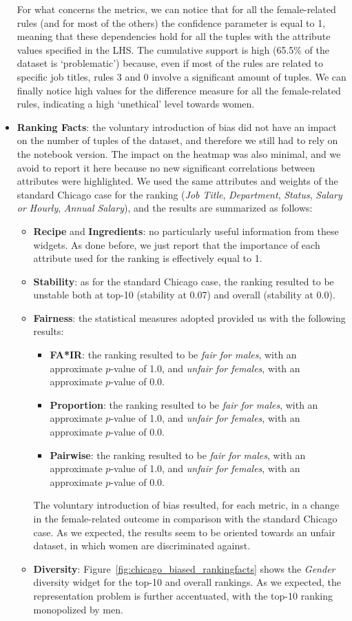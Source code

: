 \begin{itemize}
For what concerns the metrics, we can notice that for all the female-related rules (and for most of the others) the confidence parameter is equal to 1, meaning that these dependencies hold for all the tuples with the attribute values specified in the LHS. The cumulative support is high (65.5\% of the dataset is `problematic') because, even if most of the rules are related to specific job titles, rules 3 and 0 involve a significant amount of tuples. We can finally notice high values for the difference measure for all the female-related rules, indicating a high `unethical' level towards women.
\item \textbf{Ranking Facts}: the voluntary introduction of bias did not have an impact on the number of tuples of the dataset, and therefore we still had to rely on the notebook version. The impact on the heatmap was also minimal, and we avoid to report it here because no new significant correlations between attributes were highlighted. We used the same attributes and weights of the standard Chicago case for the ranking (\textit{Job Title}, \textit{Department}, \textit{Status}, \textit{Salary or Hourly}, \textit{Annual Salary}), and the results are summarized as follows:
\begin{itemize}
\item \textbf{Recipe} and \textbf{Ingredients}: no particularly useful information from these widgets. As done before, we just report that the importance of each attribute used for the ranking is effectively equal to 1.
\item \textbf{Stability}: as for the standard Chicago case, the ranking resulted to be unstable both at top-10 (stability at 0.07) and overall (stability at 0.0).
\item \textbf{Fairness}: the statistical measures adopted provided us with the following results:
\begin{itemize}
\item \textbf{FA*IR}: the ranking resulted to be \textit{fair for males}, with an approximate \(p\)-value of 1.0, and \textit{unfair for females}, with an approximate \(p\)-value of 0.0.
\item \textbf{Proportion}: the ranking resulted to be \textit{fair for males}, with an approximate \(p\)-value of 1.0, and \textit{unfair for females}, with an approximate \(p\)-value of 0.0.
\item \textbf{Pairwise}: the ranking resulted to be \textit{fair for males}, with an approximate \(p\)-value of 1.0, and \textit{unfair for females}, with an approximate \(p\)-value of 0.0.
\end{itemize}
The voluntary introduction of bias resulted, for each metric, in a change in the female-related outcome in comparison with the standard Chicago case. As we expected, the results seem to be oriented towards an unfair dataset, in which women are discriminated against.
\item \textbf{Diversity}: Figure~\ref{fig:chicago_biased_rankingfacts} shows the \textit{Gender} diversity widget for the top-10 and overall rankings. As we expected, the representation problem is further accentuated, with the top-10 ranking monopolized by men.


\end{itemize}
\end{itemize}
